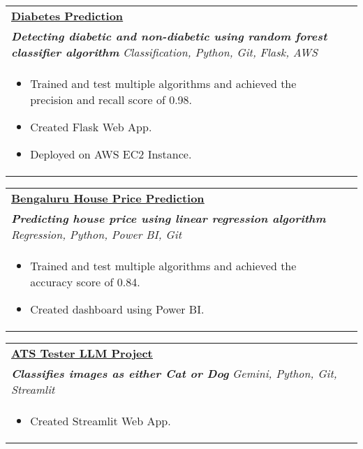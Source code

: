 \documentclass[a4paper,8pt]{article}
\begin{document}
\begin{tabularx}{\linewidth}{ @{}l r@{} }
\color[HTML]{1C033C} \textbf{\uline{\href{https://github.com/vikaschauhan734/diabetes_prediction}{Diabetes Prediction}}}\\[4pt]
\color[HTML]{371e77}\textbf{\textit{Detecting diabetic and non-diabetic using random forest classifier algorithm }} \hfill \color[HTML]{4B28A4} \textit{Classification, Python, Git, Flask, AWS} \\[5pt]
\begin{minipage}[t]{\linewidth}
    \begin{itemize}[nosep,after=\strut, leftmargin=2em, itemsep=2pt]
        \item Trained and test multiple algorithms and achieved the precision and recall score of 0.98.
        \item Created Flask Web App.
	\item Deployed on AWS EC2 Instance.
    \end{itemize}
    \end{minipage}
\end{tabularx}

\begin{tabularx}{\linewidth}{ @{}l r@{} }
\color[HTML]{1C033C} \textbf{\uline{\href{https://github.com/vikaschauhan734/house_price_prediction}{Bengaluru House Price Prediction}}}\\[4pt]
\color[HTML]{371e77}\textbf{\textit{Predicting house price using linear regression algorithm}} \hfill \color[HTML]{4B28A4} \textit{Regression, Python, Power BI, Git} \\[5pt]
\begin{minipage}[t]{\linewidth}
    \begin{itemize}[nosep,after=\strut, leftmargin=2em, itemsep=2pt]
        \item Trained and test multiple algorithms and achieved the accuracy score of 0.84.
        \item Created dashboard using Power BI.
    \end{itemize}
    \end{minipage}
\end{tabularx}

\begin{tabularx}{\linewidth}{ @{}l r@{} }
\color[HTML]{1C033C} \textbf{\uline{\href{https://github.com/vikaschauhan734/ats_llm_model}{ATS Tester LLM Project}}}\\[4pt]
\color[HTML]{371e77}\textbf{\textit{Classifies images as either Cat or Dog}} \hfill \color[HTML]{4B28A4} \textit{Gemini, Python, Git, Streamlit} \\[5pt]
\begin{minipage}[t]{\linewidth}
    \begin{itemize}[nosep,after=\strut, leftmargin=2em, itemsep=2pt]
	\item Created Streamlit Web App.
    \end{itemize}
    \end{minipage}
\end{tabularx}
\end{document}
